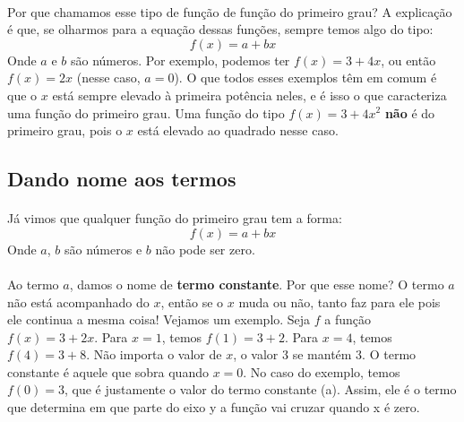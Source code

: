 \documentclass[11pt]{article}
\begin{document}
\paragraph{}
Por que chamamos esse tipo de função de função do primeiro grau? A explicação
é que, se olharmos para a equação dessas funções, sempre temos algo do tipo:
$$f(x) = a + bx$$
Onde $a$ e $b$ são números. Por exemplo, podemos ter $f(x) = 3 + 4x$, ou 
então $f(x) = 2x$ (nesse caso, $a=0$). O que todos esses exemplos têm em 
comum é que o $x$ está sempre elevado à primeira potência neles, e é isso o 
que caracteriza uma função do primeiro grau. Uma função do tipo 
$f(x) = 3 + 4x^2$ \textbf{não} é do primeiro grau, pois o $x$ está elevado ao
quadrado nesse caso.

\subsection{Dando nome aos termos}
\paragraph{}
Já vimos que qualquer função do primeiro grau tem a forma:
$$f(x) = a + bx$$
Onde $a$, $b$ são números e $b$ não pode ser zero. 
\paragraph{}
Ao termo $a$, damos o nome de \textbf{termo constante}. Por que esse nome?
O termo $a$ não está acompanhado do $x$, então se o $x$ muda ou não, tanto
faz para ele pois ele continua a mesma coisa! Vejamos um exemplo. Seja $f$ a
função $f(x) = 3 + 2x$. Para $x=1$, temos $f(1) = 3 + 2$. Para $x=4$, temos
$f(4) = 3 + 8$. Não importa o valor de $x$, o valor 3 se mantém 3. O termo 
constante é aquele que sobra quando $x=0$. No caso do exemplo, temos 
$f(0) = 3$, que é justamente o valor do termo constante (a). Assim, ele é 
o termo que determina em que parte do eixo y a função vai cruzar quando x é
zero.
\end{document}
